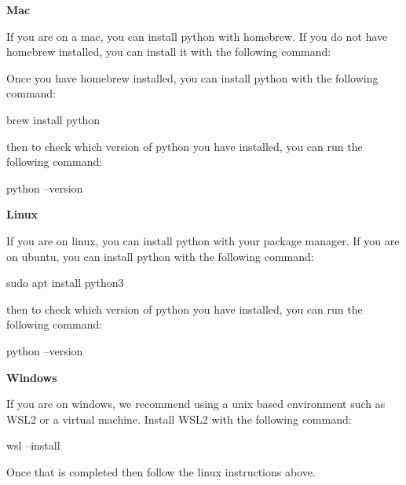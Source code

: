 \documentclass{csse4400}
\begin{document}
\begin{framed}
  \textbf{Mac}
  
  If you are on a mac, you can install python with homebrew. If you do not have homebrew installed, you can install it with the following command:


  Once you have homebrew installed, you can install python with the following command:

  \begin{code}[language=bash]{}
  brew install python
  \end{code}

  then to check which version of python you have installed, you can run the following command:

  \begin{code}[language=bash]{}
  python --version
  \end{code}
\end{framed}
\begin{framed}
\textbf{Linux}

If you are on linux, you can install python with your package manager. If you are on ubuntu, you can install python with the following command:

\begin{code}[language=bash]{}
sudo apt install python3
\end{code}

then to check which version of python you have installed, you can run the following command:

\begin{code}[language=bash]{}
python --version
\end{code}
\end{framed}
\begin{framed}
\textbf{Windows}

If you are on windows, we recommend using a unix based environment such as WSL2 or a virtual machine. Install WSL2 with the following command:

\begin{code}[language=bash]{}
wsl --install
\end{code}

Once that is completed then follow the linux instructions above.
\end{framed}
\end{document}
